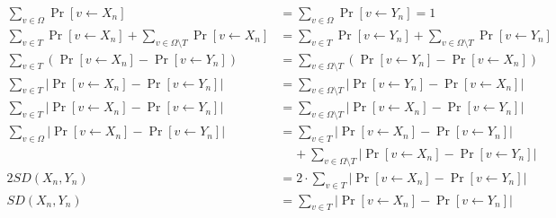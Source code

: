 \documentclass[12pt]{tufte-book}
\begin{document}
\begin{align*}
    \sum\limits_{v \in \Omega} \Pr[v \leftarrow X_n] &= \sum\limits_{v \in \Omega} \Pr[v \leftarrow Y_n] = 1 \\
    \sum\limits_{v \in T}\Pr[v \leftarrow X_n] + \sum\limits_{v \in \Omega\setminus T}\Pr[v \leftarrow X_n] &= \sum\limits_{v \in T}\Pr[v \leftarrow Y_n] + \sum\limits_{v \in \Omega\setminus T}\Pr[v \leftarrow Y_n]\\
    \sum\limits_{v \in T}(\Pr[v \leftarrow X_n] - \Pr[v \leftarrow Y_n]) &= \sum\limits_{v \in \Omega \setminus T}(\Pr[v \leftarrow Y_n] - \Pr[v \leftarrow X_n])\\
    \sum\limits_{v \in T}|\Pr[v \leftarrow X_n] - \Pr[v \leftarrow Y_n]| &= \sum\limits_{v \in \Omega \setminus T}|\Pr[v \leftarrow Y_n] - \Pr[v \leftarrow X_n]|\\
    \sum\limits_{v \in T}|\Pr[v \leftarrow X_n] - \Pr[v \leftarrow Y_n]| &= \sum\limits_{v \in \Omega \setminus T}|\Pr[v \leftarrow X_n] - \Pr[v \leftarrow Y_n]|\\
    \sum\limits_{v \in \Omega}|\Pr[v \leftarrow X_n] - \Pr[v \leftarrow Y_n]| &= \sum\limits_{v \in T}|\Pr[v \leftarrow X_n] - \Pr[v \leftarrow Y_n]|\\
    &\;\;\;\; + \sum\limits_{v \in \Omega \setminus T}|\Pr[v \leftarrow X_n] - \Pr[v \leftarrow Y_n]|\\
    2SD(X_n, Y_n) &= 2 \cdot \sum\limits_{v \in T}|\Pr[v \leftarrow X_n] - \Pr[v \leftarrow Y_n]|\\
    SD(X_n, Y_n) &= \sum\limits_{v \in T}|\Pr[v \leftarrow X_n] - \Pr[v \leftarrow Y_n]|
\end{align*}
\end{document}
